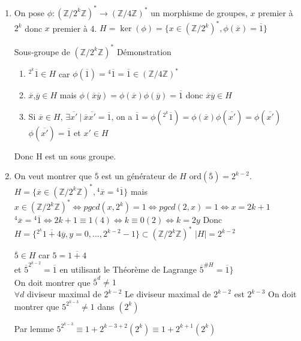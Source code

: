 \documentclass[a4paper,10pt]{book} %
\newcommand{\Z}{\mathbb{Z}}
\newcommand{\abs}[1]{\left|#1\right|}
\newcommand{\tq}{~|~}
\newcommand{\ord}{\mathrm{ord}}
\begin{document}
\begin{enumerate}
\item On pose $\phi:(\Z/2^k\Z)^*\rightarrow (\Z/4\Z)^*$ un morphisme de groupes, $x$ premier à $2^k$ donc $x$ premier à 4.
$H=\ker(\phi)=\{x\in (\Z/2^k)^*, \phi(\overline{x})=\overline{1}\}$

Sous-groupe de $(\Z/2^k\Z)^*$
Démonstration
\begin{enumerate}
\item ${}^{2^k}\overline{1}\in H$ car $\phi(\overline{1})={}^4\overline{1}=\overline{1}\in (\Z/4\Z)^*$
\item $\overline{x}$,$\overline{y}\in H$ mais $\phi(\overline{x}\overline{y})=\phi(\overline{x})\phi(\overline{y})=\overline{1}$ donc $\overline{x}\overline{y}\in H$
\item Si $\overline{x}\in H$, $\exists \overline{x'}\tq \overline{x}\overline{x'}=\overline{1}$, on a $\overline{1}=\phi({}^{2^k}\overline{1})=\phi(\overline{x})\phi(\overline{x'})=\phi(\overline{x'})$
$\phi(\overline{x'})=\overline{1}$ et $x'\in H$
\end{enumerate}

Donc H est un sous groupe.

\item On veut montrer que $\overline{5}$ est un générateur de $H$ 
$\ord(\overline{5}) = 2^{k-2}$.\\

$H=\{\overline{x}\in (\Z/2^k\Z)^* ,{}^4\overline{x}={}^4\overline{1}\}$ mais $x\in(\Z/2^k\Z)^* \Leftrightarrow pgcd(x,2^k)=1\Leftrightarrow pgcd(2,x)=1 \Leftrightarrow x=2k+1$\\

${}^4\overline{x}={}^4\overline{1} \Leftrightarrow 2k+1 \equiv 1(4) \Leftrightarrow k\equiv 0(2) \Leftrightarrow k=2y$
Donc $H=\{{}^{2^k}\overline{1+4}\overline{y} , y=0,...,2^{k-2}-1\} \subset (\Z/2^k\Z)^*$
$\abs{H} =2^{k-2}$

$\overline{5}\in H$ car $5=\overline{1+4}$\\
et $\overline{5}^{2^{k-2}} = \overline{1}$ en utilisant le Théorème de Lagrange $\overline{5}^{\#H} = \overline{1}\}$\\

On doit montrer que $\overline{5}^d \neq 1$ \\
$\forall d$ diviseur maximal de $2^{k-2}$
Le diviseur maximal de $2^{k-2}$ est $2^{k-3}$
On doit montrer que $5^{2^{k-3}} \neq 1$ dans $(2^k)$

Par lemme $5^{2^{k-3}} \equiv 1+2^{k-3+2} (2^k) \equiv 1+2^{k+1} (2^k)$\\


\end{enumerate}
\end{document}
